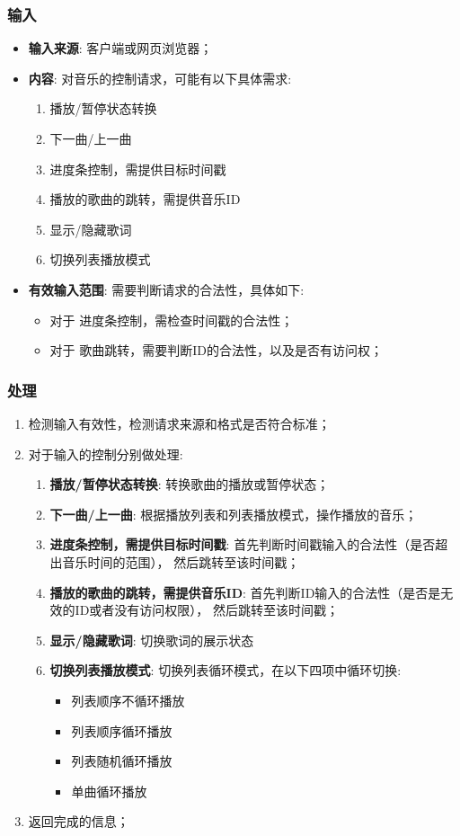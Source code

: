 \subsubsection{输入}
	\begin{itemize}
		\item \textbf{输入来源}: 客户端或网页浏览器；
		\item \textbf{内容}: 对音乐的控制请求，可能有以下具体需求: 
		\begin{enumerate}
			\item 播放/暂停状态转换
			\item 下一曲/上一曲
			\item 进度条控制，需提供目标时间戳
			\item 播放的歌曲的跳转，需提供音乐ID
			\item 显示/隐藏歌词
			\item 切换列表播放模式
		\end{enumerate}
		\item \textbf{有效输入范围}: 需要判断请求的合法性，具体如下: 
		\begin{itemize}
			\item 对于 进度条控制，需检查时间戳的合法性；
			\item 对于 歌曲跳转，需要判断ID的合法性，以及是否有访问权； 
		\end{itemize}
	\end{itemize}
\subsubsection{处理}
	\begin{enumerate}
		\item 检测输入有效性，检测请求来源和格式是否符合标准；
		\item 对于输入的控制分别做处理: 
		\begin{enumerate}
			\item \textbf{播放/暂停状态转换}: 
				转换歌曲的播放或暂停状态；
			\item \textbf{下一曲/上一曲}: 
				根据播放列表和列表播放模式，操作播放的音乐；
			\item \textbf{进度条控制，需提供目标时间戳}: 
				首先判断时间戳输入的合法性（是否超出音乐时间的范围），
				然后跳转至该时间戳；
			\item \textbf{播放的歌曲的跳转，需提供音乐ID}: 
				首先判断ID输入的合法性（是否是无效的ID或者没有访问权限），
				然后跳转至该时间戳；
			\item \textbf{显示/隐藏歌词}: 
				切换歌词的展示状态
			\item \textbf{切换列表播放模式}: 
				切换列表循环模式，在以下四项中循环切换: 
					\begin{itemize}
						\item 列表顺序不循环播放
						\item 列表顺序循环播放
						\item 列表随机循环播放
						\item 单曲循环播放
					\end{itemize}
		\end{enumerate}
		\item 返回完成的信息；
	\end{enumerate}

